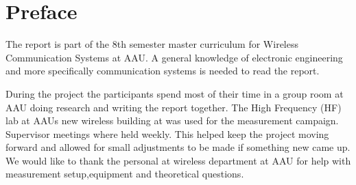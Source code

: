 \chapter*{Preface}\label{ch:forord}%
The report is part of the 8th semester master curriculum for Wireless Communication Systems at \gls{AAU}. A general knowledge of electronic engineering and more specifically communication systems is needed to read the report.

During the project the participants spend most of their time in a group room at \gls{AAU} doing research and writing the report together. The High Frequency (HF) lab at \gls{AAU}s new wireless building at was used for the measurement campaign. Supervisor meetings where held weekly. This helped keep the project moving forward and allowed for small adjustments to be made if something new came up. We would like to thank the personal at wireless department at \gls{AAU} for help with measurement setup,equipment and theoretical questions.

